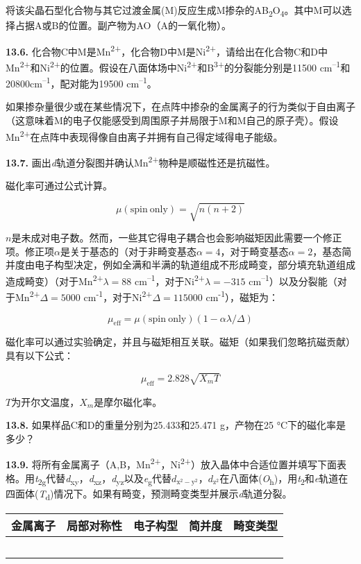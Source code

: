 将该尖晶石型化合物与其它过渡金属(M)反应生成M掺杂的AB\textsubscript{2}O\textsubscript{4}。其中M可以选择占据A或B的位置。副产物为AO（A的一氧化物）。

\noindent\textbf{13.6.}
化合物C中M是Mn\textsuperscript{2+}，化合物D中M是Ni\textsuperscript{2+}，请给出在化合物C和D中Mn\textsuperscript{2+}和Ni\textsuperscript{2+}的位置。假设在八面体场中Ni\textsuperscript{2+}和B\textsuperscript{3+}的分裂能分别是11500 cm\textsuperscript{--1}和20800cm\textsuperscript{--1}，配对能为19500 cm\textsuperscript{--1}。

如果掺杂量很少或在某些情况下，在点阵中掺杂的金属离子的行为类似于自由离子（这意味着M的电子仅能感受到周围原子并局限于M和M自己的原子壳）。假设Mn\textsuperscript{2+}在点阵中表现得像自由离子并拥有自己得定域得电子能级。

\noindent\textbf{13.7.}
画出\emph{d}轨道分裂图并确认Mn\textsuperscript{2+}物种是顺磁性还是抗磁性。

磁化率可通过公式计算。

$$\mu(\mathrm{spin\ only}) = \sqrt{n(n+2)}$$

$n$是未成对电子数。然而，一些其它得电子耦合也会影响磁矩因此需要一个修正项。修正项$\alpha$是关于基态的（对于非畸变基态$\alpha=4$，对于畸变基态$\alpha=2$，基态简并度由电子构型决定，例如全满和半满的轨道组成不形成畸变，部分填充轨道组成造成畸变）（对于Mn\textsuperscript{2+}$\lambda=88$ cm\textsuperscript{--1}，对于Ni\textsuperscript{2+}$\lambda=-315$ cm\textsuperscript{--1}）以及分裂能（对于Mn\textsuperscript{2+}$\Delta=5000$ cm\textsuperscript{-1}，对于Ni\textsuperscript{2+}$\Delta=115000$ cm\textsuperscript{-1}），磁矩为：

$$μ_{\mathrm{eff}} =\mu(\mathrm{spin\ only}) (1 −\alpha\lambda/\Delta)$$

磁化率可以通过实验确定，并且与磁矩相互关联。磁矩（如果我们忽略抗磁贡献）具有以下公式：

$$μ_{\mathrm{eff}}= 2.828\sqrt{X_mT}$$

$T$为开尔文温度，$X_m$是摩尔磁化率。

\noindent\textbf{13.8.}
如果样品C和D的重量分别为25.433和25.471 g，产物在25 °C下的磁化率是多少？

\noindent\textbf{13.9.}
将所有金属离子（A,B，Mn\textsuperscript{2+}，Ni\textsuperscript{2+}）放入晶体中合适位置并填写下面表格。用\textit{t}\textsubscript{2g}代替\textit{d}\textsubscript{xy}，\textit{d}\textsubscript{xz}，\textit{d}\textsubscript{yz}以及\textit{e}\textsubscript{g}代替$d_{\mathrm{x^2-y^2}}$，$d_{\mathrm{z^2}}$在八面体(\textit{O}\textsubscript{h})，用\textit{t}\textsubscript{2}和\textit{e}轨道在四面体(\textit{T}\textsubscript{d})情况下。如果有畸变，预测畸变类型并展示\textit{d}轨道分裂。

\begin{longtable}[]{@{}lllll@{}}
	\toprule
	\textbf{金属离子} & \textbf{局部对称性} & \textbf{电子构型} &
	\textbf{简并度} & \textbf{畸变类型}\tabularnewline
	\midrule
	\endhead
	& & & &\tabularnewline\midrule
	& & & &\tabularnewline\midrule
	& & & &\tabularnewline\midrule
	& & & &\tabularnewline\midrule
	& & & &\tabularnewline
	\bottomrule
\end{longtable}
